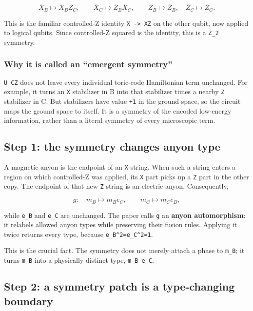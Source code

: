\documentclass[
]{article}
\begin{document}
\[
\bar X_B \mapsto \bar X_B\bar Z_C,\qquad
\bar X_C \mapsto \bar Z_B\bar X_C,\qquad
\bar Z_B\mapsto\bar Z_B,\quad \bar Z_C\mapsto\bar Z_C.
\]

This is the familiar controlled-Z identity
\texttt{X\ -\textgreater{}\ XZ} on the other qubit, now applied to
logical qubits. Since controlled-Z squared is the identity, this is a
\texttt{Z\_2} symmetry.

\subsubsection{Why it is called an ``emergent
symmetry''}\label{why-it-is-called-an-emergent-symmetry}

\texttt{U\_CZ} does not leave every individual toric-code Hamiltonian
term unchanged. For example, it turns an \texttt{X} stabilizer in B into
that stabilizer times a nearby \texttt{Z} stabilizer in C. But
stabilizers have value \texttt{+1} in the ground space, so the circuit
maps the ground space to itself. It is a symmetry of the encoded
low-energy information, rather than a literal symmetry of every
microscopic term.

\subsection{Step 1: the symmetry changes anyon
type}\label{step-1-the-symmetry-changes-anyon-type}

A magnetic anyon is the endpoint of an \texttt{X}-string. When such a
string enters a region on which controlled-Z was applied, its \texttt{X}
part picks up a \texttt{Z} part in the other copy. The endpoint of that
new \texttt{Z} string is an electric anyon. Consequently,

\[
g:\quad m_B\longmapsto m_B e_C,\qquad m_C\longmapsto m_C e_B,
\]

while \texttt{e\_B} and \texttt{e\_C} are unchanged. The paper calls
\texttt{g} an \textbf{anyon automorphism}: it relabels allowed anyon
types while preserving their fusion rules. Applying it twice returns
every type, because \texttt{e\_B\^{}2=e\_C\^{}2=1}.

This is the crucial fact. The symmetry does not merely attach a phase to
\texttt{m\_B}; it turns \texttt{m\_B} into a physically distinct type,
\texttt{m\_B\ e\_C}.

\subsection{Step 2: a symmetry patch is a type-changing
boundary}\label{step-2-a-symmetry-patch-is-a-type-changing-boundary}
\end{document}
